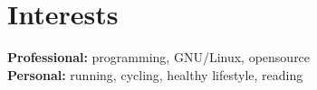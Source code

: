 \documentclass[]{friggeri-cv}
\begin{document}

\section{Interests}

\textbf{Professional:} programming, GNU/Linux, opensource
\\
\textbf{Personal:} running, cycling, healthy lifestyle, reading
\end{document}
